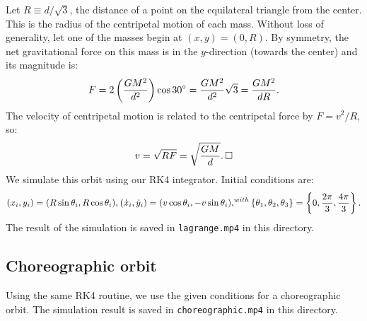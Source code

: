 \documentclass{article}
\begin{document}
Let $R \equiv d / \sqrt{3}$, the distance of a point on the equilateral
triangle from the center. This is the radius of the centripetal motion of
each mass. Without loss of generality, let one of the masses begin at
$(x, y) = (0, R)$. By symmetry, the net gravitational force on this mass
is in the $y$-direction (towards the center) and its magnitude is:
\begin{align}
    F = 2 \left(G M^2 \over d^2\right)\cos 30^\circ = 
    {GM^2 \over d^2} \sqrt 3 = {GM^2 \over dR}.
\end{align}
The velocity of centripetal motion is related to the centripetal force by
$F = v^2 / R$, so:
\begin{align}
    v = \sqrt{RF} = \sqrt{GM \over d}.\,\square
\end{align}
We simulate this orbit using our RK4 integrator. Initial conditions are:
\begin{align}
    (x_i, y_i) = (R\sin\theta_i, R\cos\theta_i),
    \sp{} (\dot x_i, \dot y_i) = (v\cos\theta_i, -v\sin\theta_i),
    \sp{with} \{\theta_1, \theta_2, \theta_3\} =
    \left\{0, {2\pi \over 3}, {4\pi \over 3} \right\}.
\end{align}
The result of the simulation is saved in \texttt{lagrange.mp4} in this
directory.

\subsection{Choreographic orbit}

Using the same RK4 routine, we use the given conditions for a
choreographic orbit. The simulation result is saved in
\texttt{choreographic.mp4} in this directory.
\end{document}
